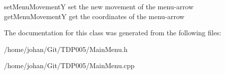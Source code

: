 set\-Menu\-Movement\-Y set the new movement of the menu-\/arrow get\-Menu\-Movement\-Y get the coordinates of the menu-\/arrow 

\-The documentation for this class was generated from the following files\-:\begin{DoxyCompactItemize}
\item 
/home/johan/\-Git/\-T\-D\-P005/\-Main\-Menu.\-h\item 
/home/johan/\-Git/\-T\-D\-P005/\-Main\-Menu.\-cpp\end{DoxyCompactItemize}
